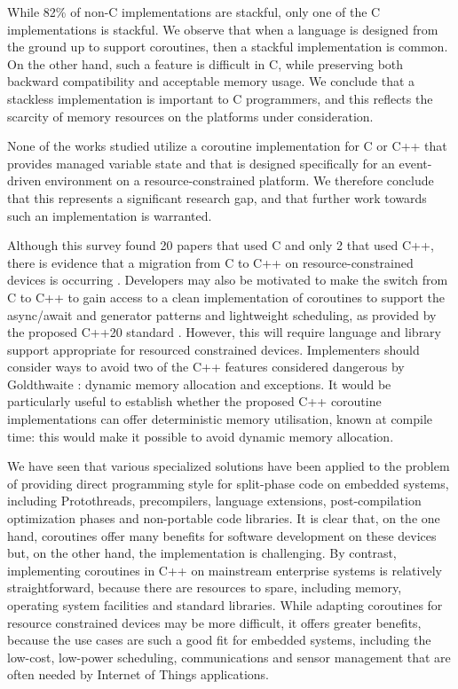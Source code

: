 \documentclass[format=acmsmall, review=false, screen=false]{acmart}
\begin{document}
While 82\% of non-C implementations are stackful, only one of the C implementations is stackful. We observe that when a language is designed from the ground up to support coroutines, then a stackful implementation is common. On the other hand, such a feature is difficult in C, while preserving both backward compatibility and acceptable memory usage. We conclude that a stackless implementation is important to C programmers, and this reflects the scarcity of memory resources on the platforms under consideration.

None of the works studied utilize a coroutine implementation for C or C++ that provides managed variable state and that is designed specifically for an event-driven environment on a resource-constrained platform. We therefore conclude that this represents a significant research gap, and that further work towards such an implementation is warranted.

Although this survey found 20 papers that used C and only 2 that used C++, there is evidence that a migration from C to C++ on resource-constrained devices is occurring \cite{AspenCore2017}. Developers may also be motivated to make the switch from C to C++ to gain access to a clean implementation of coroutines to support the async/await and generator patterns and lightweight scheduling, as provided by the proposed C++20 standard \cite{ISO2017}. However, this will require language and library support appropriate for resourced constrained devices. Implementers should consider ways to avoid two of the C++ features considered dangerous by Goldthwaite \cite{Goldthwaite2006}: dynamic memory allocation and exceptions. It would be particularly useful to establish whether the proposed C++ coroutine implementations can offer deterministic memory utilisation, known at compile time: this would make it possible to avoid dynamic memory allocation.

We have seen that various specialized solutions have been applied to the problem of providing direct programming style for split-phase code on embedded systems, including Protothreads, precompilers, language extensions, post-compilation optimization phases and non-portable code libraries. It is clear that, on the one hand, coroutines offer many benefits for software development on these devices but, on the other hand, the implementation is challenging. By contrast, implementing coroutines in C++ on mainstream enterprise systems is relatively straightforward, because there are resources to spare, including memory, operating system facilities and standard libraries. While adapting coroutines for resource constrained devices may be more difficult, it offers greater benefits, because the use cases are such a good fit for embedded systems, including the low-cost, low-power scheduling, communications and sensor management that are often needed by Internet of Things applications.
\end{document}

